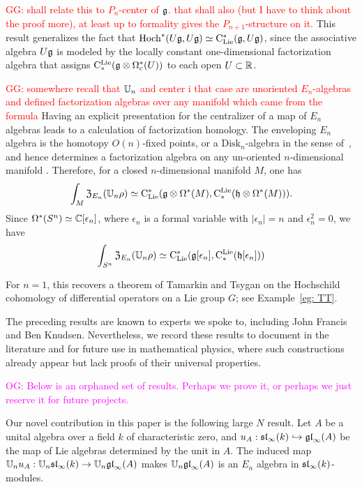 \documentclass[11pt]{amsart}
\numberwithin{equation}{section}
\def\owen{\textcolor{magenta}{OG: }\textcolor{magenta}}
\def\greg{\textcolor{red}{GG: }\textcolor{red}}
\begin{document}
\greg{shall relate this to $P_n$-center of $\fg$. that shall also (but I have to think about the proof more), 
at least up to formality gives the $P_{n+1}$-structure on it. }
This result generalizes the fact that $\Hoch^*(U\fg,U\fg) \simeq \clies(\fg, U\fg)$, 
since the associative algebra $U\fg$ is modeled by the locally constant one-dimensional factorization algebra that assigns
$\cliels (\fg \otimes \Omega^*_c(U))$ to each open $U \subset \RR$. 

\greg{somewhere recall that $\UU_n$ and center i that case are unoriented $E_n$-algebras and defined factorization algebras over any manifold which came from the formula}
Having an explicit presentation for the centralizer of a map of $E_n$ algebras leads to a calculation of factorization homology.
The enveloping $E_n$ algebra is the homotopy $O(n)$-fixed points, or a $\mathrm{Disk}_n$-algebra in the sense of~\cite{AF},
and hence determines a factorization algebra on any un-oriented $n$-dimensional manifold \cite{Knudsen}.
Therefore, for a closed $n$-dimensional manifold $M$, one has
\[
\int_M {\frak Z}_{E_n}(\UU_n \rho) \simeq \clies(\fg \otimes \Omega^*(M), \cliels( \fh \otimes \Omega^*(M))).
\]
Since $\Omega^*(S^n) \simeq \CC[\epsilon_n]$, where $\epsilon_n$ is a formal variable with $|\epsilon_n| = n$ and $\epsilon_n^2 = 0$, we have
\[
\int_{S^n} {\frak Z}_{E_n}(\UU_n \rho) \simeq \clies(\fg[\epsilon_n], \cliels( \fh[\epsilon_n]))
\]

For $n=1$, this recovers a theorem of Tamarkin and Tsygan \cite{TT} on the Hochschild cohomology of differential operators on a Lie group $G$;
see Example~\ref{eg: TT}. 

\begin{rmk}
The preceding results are known to experts we spoke to, including John Francis and Ben Knudsen. 
Nevertheless, we record these results to document in the literature and for future use in mathematical physics,
where such constructions already appear but lack proofs of their universal properties.
\end{rmk}

\owen{Below is an orphaned set of results. Perhaps we prove it, or perhaps we just reserve it for future projects.}

Our novel contribution in this paper is the following large $N$ result. Let $A$ be a unital algebra over a field $k$ of characteristic zero, 
and $u_A: \sl_\infty(k) \hookrightarrow \gl_\infty(A)$ be the map of Lie algebras determined by the unit in $A$. 
The induced map $\UU_nu_A: \UU_n\sl_\infty(k) \to \UU_n\gl_\infty(A)$ makes $\UU_n\gl_\infty(A)$ is an $E_n$ algebra in $\sl_\infty(k)$-modules.
\end{document}

